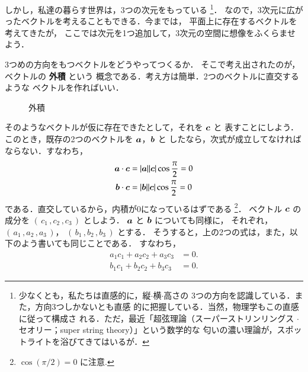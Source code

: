                 しかし，私達の暮らす世界は，3つの次元をもっている
                    \footnote{
                        少なくとも，私たちは直感的に，縦$\cdot$横$\cdot$高さの
                        3つの方向を認識している．また，方向3つしかないとも直感
                        的に把握している．当然，物理学もこの直感に従って構成さ
                        れる．ただ，最近「超弦理論（スーパーストリンリングス
                        $\cdot$セオリー；super string theory）」という数学的な
                        匂いの濃い理論が，スポットライトを浴びてきてはいるが．
                    }．
                なので，3次元に広がったベクトルを考えることもできる．今までは，
                平面上に存在するベクトルを考えてきたが，
                ここでは次元を1つ追加して，3次元の空間に想像をふくらませよう．

                3つめの方向をもつベクトルをどうやってつくるか．
                そこで考え出されたのが，ベクトルの \textbf{外積} という
                概念である．考え方は簡単．2つのベクトルに直交するような
                ベクトルを作ればいい．
                    \begin{figure}[hbt]
                        \begin{center}
                            \caption{外積}
                            \label{fig:gaiseki_01}
                        \end{center}
                    \end{figure}

                そのようなベクトルが仮に存在できたとして，それを $\boldsymbol{c}$ と
                表すことにしよう．このとき，既存の2つのベクトルを $\boldsymbol{a}$，$\boldsymbol{b}$ と
                したなら，次式が成立してなければならない．すなわち，
                    \begin{align*}
                        \boldsymbol{a} \cdot \boldsymbol{c} &= |\boldsymbol{a}||\boldsymbol{c}| \cos \frac{\pi}{2} = 0 \\
                        \boldsymbol{b} \cdot \boldsymbol{c} &= |\boldsymbol{b}||\boldsymbol{c}| \cos \frac{\pi}{2} = 0
                    \end{align*}
                である．直交しているから，内積が0になっているはずである
                    \footnote{
                        $\cos(\pi/2)=0$ に注意.
                    }．
                ベクトル $\boldsymbol{c}$ の成分を $(\,c_{1}\,,c_{2}\,,c_{3}\,)$ としよう．
                $\boldsymbol{a}$ と $\boldsymbol{b}$ についても同様に，
                それぞれ，$(\,a_{1}\,,a_{2}\,,a_{3}\,)$，
                $(\,b_{1}\,,b_{2}\,,b_{3}\,)$ とする．
                そうすると，上の2つの式は，また，以下のよう書いても同じことである．
                すなわち，
                    \begin{align*}
                        a_{1}c_{1} + a_{2}c_{2} + a_{3}c_{3} &= 0. \\
                        b_{1}c_{1} + b_{2}c_{2} + b_{3}c_{3} &= 0.
                    \end{align*}

